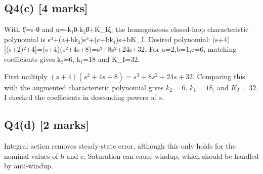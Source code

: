 \documentclass[11pt,a4paper]{article}
\begin{document}
\subsection*{Q4(c) \hfill [4 marks]}

With ξ̇=r-θ and u=-k₁θ-k₂θ̇+K\_Iξ, the homogeneous closed-loop characteristic polynomial is s³+(a+bk₂)s²+(c+bk₁)s+bK\_I.
Desired polynomial: (s+4)[(s+2)²+4]=(s+4)(s²+4s+8)=s³+8s²+24s+32.
For a=2,b=1,c=6, matching coefficients gives k₂=6, k₁=18 and K\_I=32.\par\smallskip First multiply $(s+4)(s^2+4s+8)=s^3+8s^2+24s+32$. Comparing this with the augmented characteristic polynomial gives $k_2=6$, $k_1=18$, and $K_I=32$. I checked the coefficients in descending powers of $s$.

\subsection*{Q4(d) \hfill [2 marks]}

Integral action removes steady-state error, although this only holds for the nominal values of b and c.
Saturation can cause windup, which should be handled by anti-windup.
\end{document}
